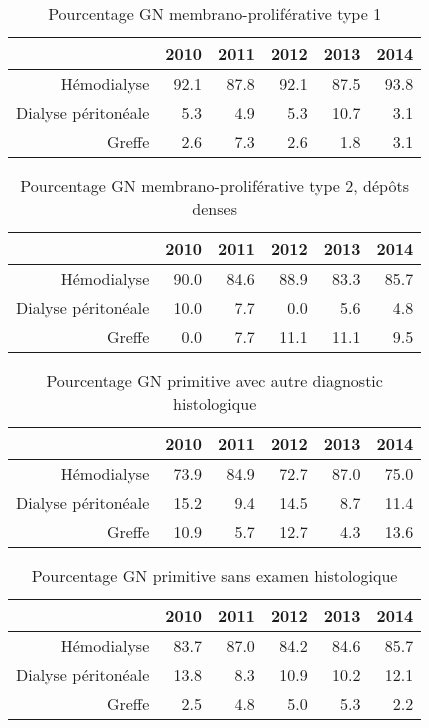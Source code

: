 \documentclass[11pt,a4paper]{article}\usepackage[]{graphicx}\usepackage[]{color}
\begin{document}
\begin{table}[H]
\centering
\begin{tabular}{rrrrrr}
  \hline
 & 2010 & 2011 & 2012 & 2013 & 2014 \\ 
  \hline
Hémodialyse & 92.1 & 87.8 & 92.1 & 87.5 & 93.8 \\ 
  Dialyse péritonéale & 5.3 & 4.9 & 5.3 & 10.7 & 3.1 \\ 
  Greffe & 2.6 & 7.3 & 2.6 & 1.8 & 3.1 \\ 
   \hline
\end{tabular}
\caption{Pourcentage GN membrano-proliférative type 1} 
\end{table}
\begin{table}[H]
\centering
\begin{tabular}{rrrrrr}
  \hline
 & 2010 & 2011 & 2012 & 2013 & 2014 \\ 
  \hline
Hémodialyse & 90.0 & 84.6 & 88.9 & 83.3 & 85.7 \\ 
  Dialyse péritonéale & 10.0 & 7.7 & 0.0 & 5.6 & 4.8 \\ 
  Greffe & 0.0 & 7.7 & 11.1 & 11.1 & 9.5 \\ 
   \hline
\end{tabular}
\caption{Pourcentage GN membrano-proliférative type 2, dépôts denses} 
\end{table}
\begin{table}[H]
\centering
\begin{tabular}{rrrrrr}
  \hline
 & 2010 & 2011 & 2012 & 2013 & 2014 \\ 
  \hline
Hémodialyse & 73.9 & 84.9 & 72.7 & 87.0 & 75.0 \\ 
  Dialyse péritonéale & 15.2 & 9.4 & 14.5 & 8.7 & 11.4 \\ 
  Greffe & 10.9 & 5.7 & 12.7 & 4.3 & 13.6 \\ 
   \hline
\end{tabular}
\caption{Pourcentage GN primitive avec autre diagnostic histologique} 
\end{table}
\begin{table}[H]
\centering
\begin{tabular}{rrrrrr}
  \hline
 & 2010 & 2011 & 2012 & 2013 & 2014 \\ 
  \hline
Hémodialyse & 83.7 & 87.0 & 84.2 & 84.6 & 85.7 \\ 
  Dialyse péritonéale & 13.8 & 8.3 & 10.9 & 10.2 & 12.1 \\ 
  Greffe & 2.5 & 4.8 & 5.0 & 5.3 & 2.2 \\ 
   \hline
\end{tabular}
\caption{Pourcentage GN primitive sans examen histologique} 
\end{table}
\end{document}
